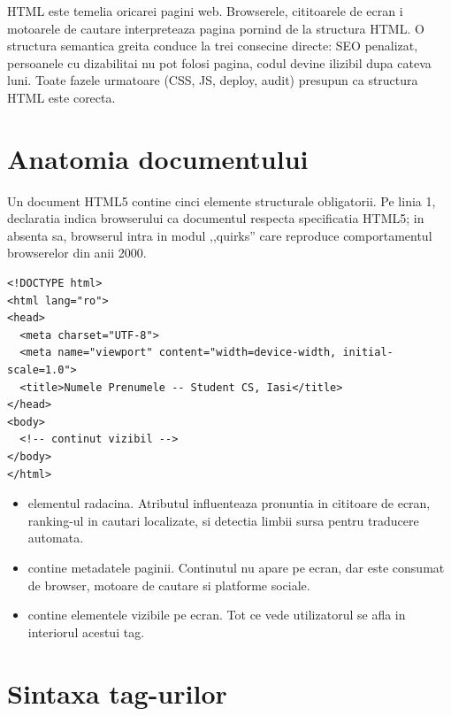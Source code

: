 \begin{whymatters}
HTML este temelia oricarei pagini web. Browserele, cititoarele de ecran i motoarele de cautare interpreteaza pagina pornind de la structura HTML. O structura semantica greita conduce la trei consecine directe: SEO penalizat, persoanele cu dizabilitai nu pot folosi pagina, codul devine ilizibil dupa cateva luni. Toate fazele urmatoare (CSS, JS, deploy, audit) presupun ca structura HTML este corecta.
\end{whymatters}

\section{Anatomia documentului}

Un document HTML5 contine cinci elemente structurale obligatorii. Pe linia 1, declaratia  indica browserului ca documentul respecta specificatia HTML5; in absenta sa, browserul intra in modul ,,quirks'' care reproduce comportamentul browserelor din anii 2000.

\begin{lstlisting}[style=html, caption={Boilerplate HTML5 conform specificatiei W3C}]
<!DOCTYPE html>
<html lang="ro">
<head>
  <meta charset="UTF-8">
  <meta name="viewport" content="width=device-width, initial-scale=1.0">
  <title>Numele Prenumele -- Student CS, Iasi</title>
</head>
<body>
  <!-- continut vizibil -->
</body>
</html>
\end{lstlisting}

\begin{itemize}
  \item {} \textendash{} elementul radacina. Atributul  influenteaza pronuntia in cititoare de ecran, ranking-ul in cautari localizate, si detectia limbii sursa pentru traducere automata.
  \item {} \textendash{} contine metadatele paginii. Continutul nu apare pe ecran, dar este consumat de browser, motoare de cautare si platforme sociale.
  \item {} \textendash{} contine elementele vizibile pe ecran. Tot ce vede utilizatorul se afla in interiorul acestui tag.
\end{itemize}

\section{Sintaxa tag-urilor}

